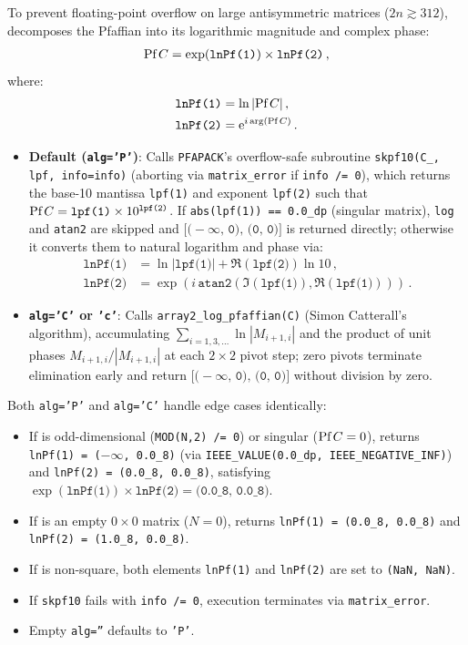 To prevent floating-point overflow on large antisymmetric matrices ($2n \gtrsim 312$),  decomposes the Pfaffian into its logarithmic magnitude and complex phase:
\begin{align}
  \text{Pf}\, C = \exp(\texttt{lnPf(1)}) \times \texttt{lnPf(2)}\, ,
\end{align}
where:
\begin{align}
  \texttt{lnPf(1)} &= \ln|\text{Pf}\, C|\, , \\
  \texttt{lnPf(2)} &= {\rm e}^{i\arg(\text{Pf}\, C)}\, .
\end{align}
\begin{itemize}
  \item \textbf{Default (\texttt{alg='P'})}: Calls \texttt{PFAPACK}'s overflow-safe subroutine \texttt{skpf10(C\_, lpf, info=info)} (aborting via \texttt{matrix\_error} if \texttt{info /= 0}), which returns the base-10 mantissa \texttt{lpf(1)} and exponent \texttt{lpf(2)} such that $\text{Pf}\, C = \texttt{lpf(1)} \times 10^{\texttt{lpf(2)}}$. If \texttt{abs(lpf(1)) == 0.0\_dp} (singular matrix), \texttt{log} and \texttt{atan2} are skipped and $\texttt{[(}-\infty\texttt{, 0), (0, 0)]}$ is returned directly; otherwise it converts them to natural logarithm and phase via:
  \begin{align}
    \texttt{lnPf(1)} &= \ln|\texttt{lpf(1)}| + \Re(\texttt{lpf(2)})\ln 10\, , \\
    \texttt{lnPf(2)} &= \exp\!\left(i\,\texttt{atan2}(\Im(\texttt{lpf(1)}), \Re(\texttt{lpf(1)}))\right)\, .
  \end{align}
  \item \textbf{\texttt{alg='C'} or \texttt{'c'}}: Calls \texttt{array2\_log\_pfaffian(C)} (Simon Catterall's algorithm), accumulating $\sum_{i=1,3,\ldots}\ln|M_{i+1,i}|$ and the product of unit phases $M_{i+1,i}/|M_{i+1,i}|$ at each $2\times 2$ pivot step; zero pivots terminate elimination early and return $\texttt{[(}-\infty\texttt{, 0), (0, 0)]}$ without division by zero.
\end{itemize}
Both \texttt{alg='P'} and \texttt{alg='C'} handle edge cases identically:
\begin{itemize}
  \item If  is odd-dimensional (\texttt{MOD(N,2) /= 0}) or singular ($\text{Pf}\, C = 0$),  returns \texttt{lnPf(1) = (}$-\infty$\texttt{, 0.0\_8)} (via \texttt{IEEE\_VALUE(0.0\_dp, IEEE\_NEGATIVE\_INF)}) and \texttt{lnPf(2) = (0.0\_8, 0.0\_8)}, satisfying $\exp(\texttt{lnPf(1)}) \times \texttt{lnPf(2)} = \texttt{(0.0\_8, 0.0\_8)}$.
  \item If  is an empty $0\times 0$ matrix ($N = 0$),  returns \texttt{lnPf(1) = (0.0\_8, 0.0\_8)} and \texttt{lnPf(2) = (1.0\_8, 0.0\_8)}.
  \item If  is non-square, both elements \texttt{lnPf(1)} and \texttt{lnPf(2)} are set to \texttt{(NaN, NaN)}.
  \item If \texttt{skpf10} fails with \texttt{info /= 0}, execution terminates via \texttt{matrix\_error}.
  \item Empty \texttt{alg=''} defaults to \texttt{'P'}.
\end{itemize}

